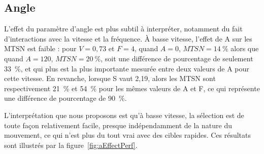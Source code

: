 	\subsection{Angle}
	L'effet du paramètre d'angle est plus subtil à interpréter, notamment du fait d'interactions avec la vitesse et la fréquence. À basse vitesse, l'effet de A sur les MTSN est faible : pour $V = 0,73$ et $F = 4$, quand $A= 0$, $MTSN = 14~\%{}$ alors que quand $A = 120$, $MTSN = 20~\%{}$, soit une différence de pourcentage de seulement 33~\%{}, et qui plus est la plus importante mesurée entre deux valeurs de A pour cette vitesse. En revanche, lorsque S vaut 2,19, alors les MTSN sont respectivement 21~\%{} et 54~\%{} pour les mêmes valeurs de A et F, ce qui représente une différence de pourcentage de 90~\%{}.
	
	L'interprétation que nous proposons est qu'à basse vitesse, la sélection est de toute façon relativement facile, presque indépendamment de la nature du mouvement, ce qui n'est plus du tout vrai avec des cibles rapides. Ces résultats sont illustrés par la figure~\ref{fig:aEffectPerf}.

